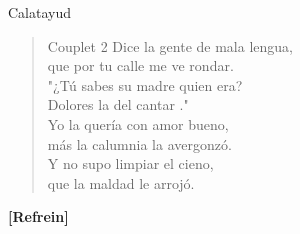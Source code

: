 \begin{song}{Calatayud}
\begin{verse}{Couplet 2}
Dice la gente de mala lengua,\\
que por tu calle me ve rondar.\hspace{1.5em}\\
"¿Tú sabes su madre quien era?\\
Dolores la del cantar ."\\
Yo la quería con amor bueno,\\
más la calumnia la avergonzó.\\
Y no supo\hspace{0.5em}\hspace{0.5em} limpiar el cieno,\\
que la maldad le arrojó.\\
\end{verse}
\textbf{[Refrein]}
\end{song}
